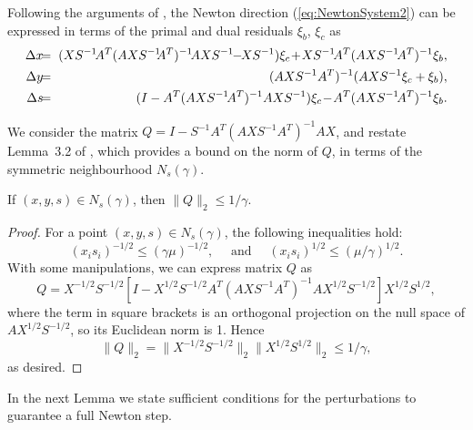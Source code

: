 Following the arguments of \cite{GondzioGrothey03}, the Newton
direction (\ref{eq:NewtonSystem2}) can be expressed in terms 
of the primal and dual residuals $\xi_b$, $\xi_c$ as
%
\begin{eqnarray}  \label{eq:Directions}
  \Delta x & \hspace{-1ex} = \hspace{-1ex} & 
  (XS^{-1} \! A^T (AXS^{-1} \!\! A^T)^{-1} \! AXS^{-1} \!\!-\!\! XS^{-1} )\xi_c
  \! + \! XS^{-1} \! A^T (AXS^{-1} \! A^T)^{-1} \xi_b, \nonumber \\
  \Delta y & \hspace{-1ex} = \hspace{-1ex} & 
  (AXS^{-1} A^T)^{-1} (AXS^{-1} \xi_c + \xi_b),                  \\
  \Delta s & \hspace{-1ex} = \hspace{-1ex} & 
  (I - A^T (AXS^{-1} \! A^T)^{-1} AXS^{-1} )\xi_c 
  \! - \! A^T (AXS^{-1} \! A^T)^{-1} \xi_b.            \nonumber
\end{eqnarray}

We consider the matrix
$Q\! =\! I - S^{-1} A^T (A X S^{-1}\! A^T)^{-1}\! A X$,
and restate Lemma~3.2 of \cite{GondzioGrothey03},
which provides a bound on the norm of $Q$, in terms of
the symmetric neighbourhood $N_s(\gamma)$.

\begin{lemma}  \label{th:BoundQ}
If $(x,y,s) \in N_s(\gamma)$, then $\|Q\|_2 \le 1/\gamma$.
\end{lemma}
%
\begin{proof}
For a point $(x,y,s) \in N_s(\gamma)$, the following inequalities hold:
\[
  (x_i s_i)^{-1/2} \le (\gamma\mu)^{-1/2},
  \quad \mbox{ and } \quad
  (x_i s_i)^{1/2} \le (\mu / \gamma)^{1/2}.
\]
With some manipulations, we can express matrix $Q$ as
\[
Q = X^{-1/2}S^{-1/2} \left[ I - X^{1/2}S^{-1/2}A^T(AXS^{-1}A^T)^{-1}AX^{1/2}S^{-1/2} \right] X^{1/2}S^{1/2},
\]
where the term in square brackets is an orthogonal projection on the null
space of $AX^{1/2}S^{-1/2}$, so its Euclidean norm is 1.
Hence
\[
  \| Q \|_2 = \| X^{-1/2}S^{-1/2} \|_2 \| X^{1/2}S^{1/2} \|_2 \le 1/\gamma,
\]
as desired.
\end{proof}

In the next Lemma we state sufficient conditions for the perturbations
to guarantee a full Newton step.

